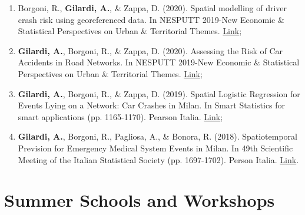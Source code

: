 \documentclass[11pt,a4paper,sans]{moderncv}
\begin{document}
\begin{enumerate}
  \item Borgoni, R., \textbf{Gilardi, A.}, \& Zappa, D. (2020). Spatial modelling of driver crash risk using georeferenced data. In NESPUTT 2019-New Economic \& Statistical Perspectives on Urban \& Territorial Themes. \href{https://www.libreriauniversitaria.it/ebook/9788833592091/autore-riccardo-borgoni/new-economic-statistical-perspectives-on-urban-and-territorial-themes-nesputt-2019-e-book.htm}{Link};
  \item \textbf{Gilardi, A.}, Borgoni, R., \& Zappa, D. (2020). Assessing the Risk of Car Accidents in Road Networks. In NESPUTT 2019-New Economic \& Statistical Perspectives on Urban \& Territorial Themes. \href{https://www.libreriauniversitaria.it/ebook/9788833592091/autore-riccardo-borgoni/new-economic-statistical-perspectives-on-urban-and-territorial-themes-nesputt-2019-e-book.htm}{Link};
  \item \textbf{Gilardi, A.}, Borgoni, R., \& Zappa, D. (2019). Spatial Logistic Regression for Events Lying on a Network: Car Crashes in Milan. In Smart Statistics for smart applications (pp. 1165-1170). Pearson Italia. \href{https://it.pearson.com/content/dam/region-core/italy/pearson-italy/pdf/Dirigenti%20e%20istituzioni/ISTITUZIONI-HE-PDF-sis2019_V4.pdf}{Link};
  \item \textbf{Gilardi, A.}, Borgoni, R., Pagliosa, A., \& Bonora, R. (2018). Spatiotemporal Prevision for Emergency Medical System Events in Milan. In 49th Scientific Meeting of the Italian Statistical Society (pp. 1697-1702). Person Italia.  \href{https://it.pearson.com/content/dam/region-core/italy/pearson-italy/pdf/Dirigenti%20e%20istituzioni/ISTITUZIONI%20-%20HE%20-%20PDF%20-%20SIS%20V4.pdf}{Link}. 
  \end{enumerate}

  \section{Summer Schools and Workshops}
  
\end{document}
